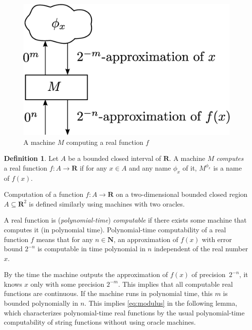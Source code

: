 \documentclass{lmcs}
\theoremstyle{definition}
\newtheorem{definition}[theorem]{Definition}
\theoremstyle{remark}
\newcommand{\R}{\mathbf R}
\newcommand{\N}{\mathbf N}
\begin{document}
\begin{figure}
 \begin{center}
  \includegraphics[height=0.17\textheight]{image/model-of-function.eps}
 \end{center}
 \caption{A machine $M$ computing a real function $f$}
 \label{fig:model-of-function}
\end{figure}

\begin{definition}
Let $A$ be a bounded closed interval of\/ $\R$.
A machine $M$ \emph{computes} a real function $f \colon A \to \R$ 
if for any $x \in A$ and any name $\phi_x$ of it,
$M^{\phi_x}$ is a name of $f(x)$.
\end{definition}

Computation of a function $f \colon A \to \R$ on
a two-dimensional bounded closed region $A \subseteq \R ^2$ 
is defined similarly using machines with two oracles.

A real function is (\emph{polynomial-time}) \emph{computable} if there exists some machine that computes it (in polynomial time).
Polynomial-time computability of a real function $f$ means that
for any $n \in \N$, 
an approximation of $f(x)$ with error bound $2^{-n}$
is computable in time polynomial in $n$ 
independent of the real number $x$.

By the time the machine outputs the approximation of $f (x)$ of precision~$2 ^{-n}$, 
it knows $x$ only with some precision $2 ^{-m}$.
This implies that all computable real functions are continuous.
If the machine runs in polynomial time,
this $m$ is bounded polynomially in $n$.
This implies \eqref{eq:modulus} in the following lemma, 
which characterizes polynomial-time real functions
by the usual polynomial-time computability of string functions 
without using oracle machines. 
\end{document}
